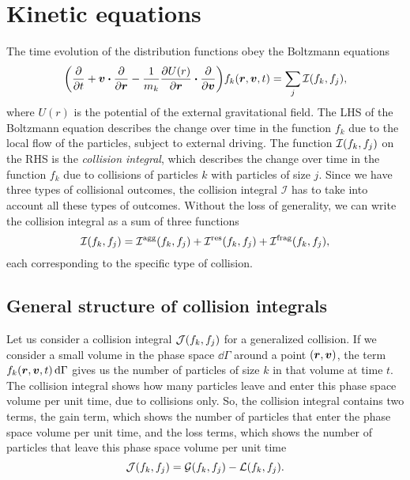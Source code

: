 \documentclass[aps,prl,preprint,groupedaddress,10pt]{revtex4-2}
\begin{document}
\section{Kinetic equations}
The time evolution of the distribution functions obey the Boltzmann equations
\begin{equation}\label{eq:kinetic_equation_generic}
    \pqty{\pdv{t}+\bv\vdot\pdv{\br}-\frac{1}{m_k}\pdv{U(r)}{\br}\vdot\pdv{\bv}}
    f_k\pqty{\br,\bv,t}=\sum_{j}\mathcal{I}\pqty{f_k,f_j},
\end{equation}
where $U(r)$ is the potential of the external gravitational field. The LHS
of the Boltzmann equation describes the change over time in the function $f_k$ due to the
local flow of the particles, subject to external driving. The function
$\mathcal{I}\pqty{f_k,f_j}$ on the RHS is the \emph{collision integral}, which
describes the change over time in the function $f_k$ due to collisions of particles $k$
with particles of size $j$. Since we have three types of collisional outcomes, the
collision integral $\mathcal{I}$ has to take into account all these types of outcomes.
Without the loss of generality, we can write the collision integral as a sum of three
functions
\begin{equation}
    \mathcal{I}\pqty{f_k,f_j}=\utx{\mathcal{I}}{agg}\pqty{f_k,f_j}+
    \utx{\mathcal{I}}{res}\pqty{f_k,f_j}+\utx{\mathcal{I}}{frag}\pqty{f_k,f_j},
\end{equation}
each corresponding to the specific type of collision.

\subsection{General structure of collision integrals}
Let us consider a collision integral $\mathcal{J}\pqty{f_k,f_j}$ for a generalized
collision. If we consider a small volume in the phase space $\dd{\Gamma}$
around a point $\pqty{\br,\bv}$, the term $f_k\pqty{\br,\bv,t}\dd{\Gamma}$ gives us
the number of particles of size $k$ in that volume at time $t$. The collision integral
shows how many particles leave and enter this phase space volume per unit time, due
to collisions only. So, the collision integral contains two terms, the gain term, which
shows the number of particles that enter the phase space volume per unit time, and the
loss terms, which shows the number of particles that leave this phase space volume per
unit time
\begin{equation}
    \mathcal{J}\pqty{f_k,f_j}=\mathcal{G}\pqty{f_k,f_j}-\mathcal{L}\pqty{f_k,f_j}.
\end{equation}
\end{document}
